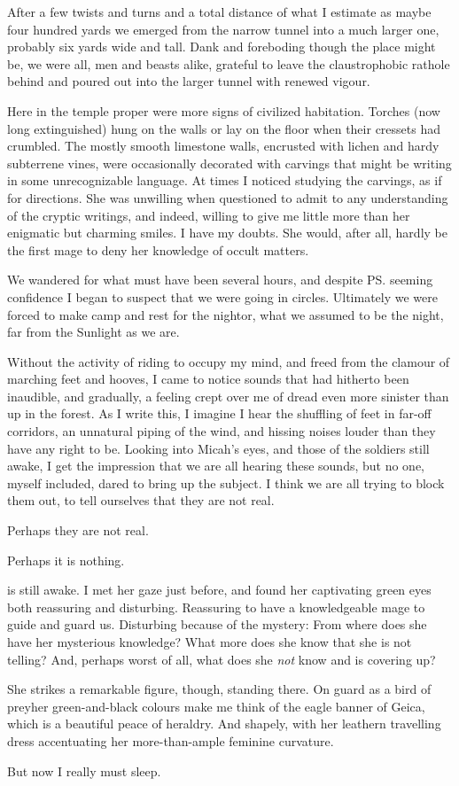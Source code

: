 \begin{diary}
After a few twists and turns and a total distance of what I estimate as maybe four hundred yards we emerged from the narrow tunnel into a much larger one, probably six yards wide and tall. 
Dank and foreboding though the place might be, we were all, men and beasts alike, grateful to leave the claustrophobic rathole behind and poured out into the larger tunnel with renewed vigour. 

Here in the temple proper were more signs of civilized habitation. Torches (now long extinguished) hung on the walls or lay on the floor when their cressets had crumbled. The mostly smooth limestone walls, encrusted with lichen and hardy subterrene vines, were occasionally decorated with carvings that might be writing in some unrecognizable language. At times I noticed \Takestsha{} studying the carvings, as if for directions. She was unwilling when questioned to admit to any understanding of the cryptic writings, and indeed, willing to give me little more than her enigmatic but charming smiles. I have my doubts. She would, after all, hardly be the first mage to deny her knowledge of occult matters. 

We wandered for what must have been several hours, and despite \Miss{} \ps{\Takestsha}{} seeming confidence I began to suspect that we were going in circles. Ultimately we were forced to make camp and rest for the night\dash or, what we assumed to be the night, far from the Sunlight as we are.

Without the activity of riding to occupy my mind, and freed from the clamour of marching feet and hooves, I came to notice sounds that had hitherto been inaudible, and gradually, a feeling crept over me of dread even more sinister than up in the forest. 
As I write this, I imagine I hear the shuffling of feet in far-off corridors, an unnatural piping of the wind, and hissing noises louder than they have any right to be. 
Looking into Micah's eyes, and those of the soldiers still awake, I get the impression that we are all hearing these sounds, but no one, myself included, dared to bring up the subject. 
I think we are all trying to block them out, to tell ourselves that they are not real. 

Perhaps they are not real.

Perhaps it is nothing. 

\Takestsha{} is still awake. I met her gaze just before, and found her captivating green eyes both reassuring and disturbing. Reassuring to have a knowledgeable mage to guide and guard us. Disturbing because of the mystery: From where does she have her mysterious knowledge? What more does she know that she is not telling? And, perhaps worst of all, what does she \emph{not} know and is covering up? 

She strikes a remarkable figure, though, standing there. On guard as a bird of prey\dash her green-and-black colours make me think of the eagle banner of Geica, which is a beautiful peace of heraldry. And shapely, with her leathern travelling dress accentuating her more-than-ample feminine curvature. 

But now I really must sleep.
\end{diary}
